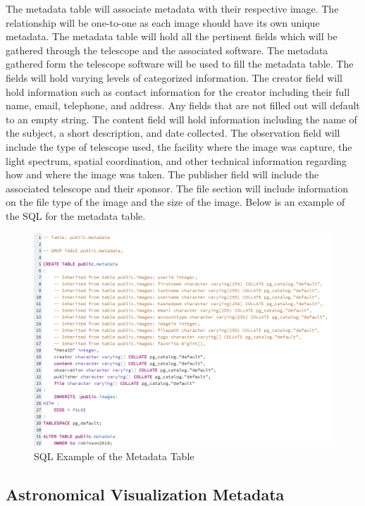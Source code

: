 \documentclass[12pt]{report}
\begin{document}
The metadata table will associate metadata with their respective image.  The relationship will be one-to-one as each image should have its own unique metadata.  The metadata table will hold all the pertinent fields which will be gathered through the telescope and the associated software.  The metadata gathered form the telescope software will be used to fill the metadata table.  The fields will hold varying levels of categorized information.  The creator field will hold information such as contact information for the creator including their full name, email, telephone, and address.  Any fields that are not filled out will default to an empty string.  The content field will hold information including the name of the subject, a short description, and date collected.  The observation field will include the type of telescope used, the facility where the image was capture, the light spectrum, spatial coordination, and other technical information regarding how and where the image was taken.  The publisher field will include the associated telescope and their sponsor.  The file section will include information on the file type of the image and the size of the image.  Below is an example of the SQL for the metadata table.

\begin{figure}[h]
	\centering
	\includegraphics[width=\linewidth]{database_metadata_table}
	\caption{SQL Example of the Metadata Table}
	\label{fig:SQL Metadata Table}
\end{figure}

\subsection{Astronomical Visualization Metadata}
\end{document}
